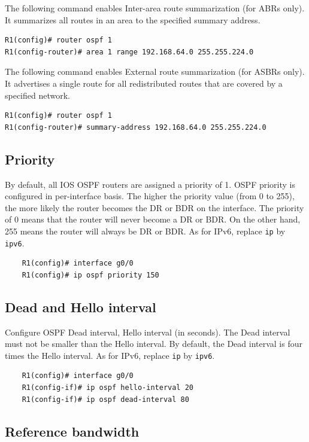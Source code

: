 The following command enables Inter-area route summarization (for ABRs only). It summarizes all routes in an area to the specified summary address.

\begin{verbatim}
R1(config)# router ospf 1
R1(config-router)# area 1 range 192.168.64.0 255.255.224.0
\end{verbatim}

The following command enables External route summarization (for ASBRs only). It advertises a single route for all redistributed routes that are covered by a specified network.

\begin{verbatim}
R1(config)# router ospf 1
R1(config-router)# summary-address 192.168.64.0 255.255.224.0
\end{verbatim}

\subsection{Priority}

By default, all IOS OSPF routers are assigned a priority of 1. OSPF priority is configured in per-interface basis. The higher the priority value (from 0 to 255), the more likely the router becomes the DR or BDR on the interface.	The priority of 0 means that the router will never  become a DR or BDR. On the other hand, 255 means the router will always be DR or BDR. As for IPv6, replace \verb|ip| by \verb|ipv6|.
	\begin{verbatim}
	R1(config)# interface g0/0 
	R1(config)# ip ospf priority 150
	\end{verbatim}
	
\subsection{Dead and Hello interval}

Configure OSPF Dead interval, Hello interval (in seconds). \note The Dead interval must not be smaller than the Hello interval. By default, the Dead interval is four times the Hello interval. As for IPv6, replace \verb|ip| by \verb|ipv6|.
	\begin{verbatim}
	R1(config)# interface g0/0
	R1(config-if)# ip ospf hello-interval 20 
	R1(config-if)# ip ospf dead-interval 80
	\end{verbatim}
	
\subsection{Reference bandwidth}	

